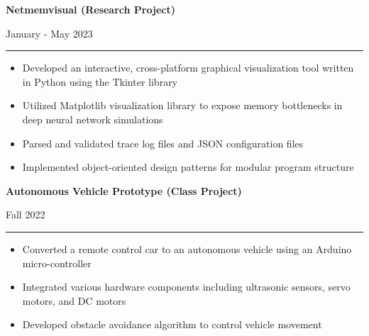 \documentclass[letter]{article}
\begin{document}
    \noindent
    \begin{minipage}[c]{0.8\linewidth}
        \noindent \textbf{Netmemvisual (Research Project)}
    \end{minipage}
    \begin{minipage}[c]{0.19\linewidth}
        \begin{flushright}
            January - May 2023
        \end{flushright}
    \end{minipage}
    \vspace{4pt}
    \hrule
    \vspace{4pt}
    \noindent
    \begin{itemize}[noitemsep, topsep=0pt]
        \item Developed an interactive, cross-platform graphical visualization tool written in Python using the Tkinter library
        \item Utilized Matplotlib visualization library to expose memory bottlenecks in deep neural network simulations
        \item Parsed and validated trace log files and JSON configuration files
        \item Implemented object-oriented design patterns for modular program structure
    \end{itemize}
    \medskip

    \noindent
    \begin{minipage}[c]{0.8\linewidth}
        \noindent \textbf{Autonomous Vehicle Prototype (Class Project)}
    \end{minipage}
    \begin{minipage}[c]{0.19\linewidth}
        \begin{flushright}
            Fall 2022
        \end{flushright}
    \end{minipage}
    \vspace{4pt}
    \hrule
    \vspace{4pt}
    \noindent
    \begin{itemize}[noitemsep, topsep=0pt]
        \item Converted a remote control car to an autonomous vehicle using an Arduino micro-controller
        \item Integrated various hardware components including ultrasonic sensors, servo motors, and DC motors
        \item Developed obstacle avoidance algorithm to control vehicle movement
    \end{itemize}
\end{document}
